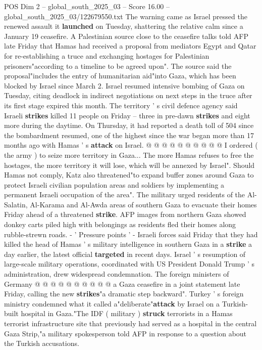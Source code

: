 \begin{textsample}{POS Dim 2 – global\_south\_2025\_03 – Score 16.00 – global\_south\_2025\_03/122679550.txt}  \label{ex:f2_pos_287}
The warning came as Israel pressed the renewed assault it \textbf{launched} on Tuesday, shattering the relative calm since a January 19 ceasefire.
A Palestinian source close to the ceasefire talks told AFP late Friday that Hamas had received a proposal from mediators Egypt and Qatar for re-establishing a truce and exchanging hostages for Palestinian prisoners"according to a timeline to be agreed upon".
The source said the proposal"includes the entry of humanitarian aid"into Gaza, which has been blocked by Israel since March 2.
Israel resumed intensive bombing of Gaza on Tuesday, citing deadlock in indirect negotiations on next steps in the truce after its first stage expired this month.
The territory ' s civil defence agency said Israeli \textbf{strikes} killed 11 people on Friday -- three in pre-dawn \textbf{strikes} and eight more during the daytime.
On Thursday, it had reported a death toll of 504 since the bombardment resumed, one of the highest since the war began more than 17 months ago with Hamas ' s \textbf{attack} on Israel. @ @ @ @ @ @ @ @ @ @ I ordered ( the army ) to seize more territory in Gaza...
The more Hamas refuses to free the hostages, the more territory it will lose, which will be annexed by Israel".
Should Hamas not comply, Katz also threatened"to expand buffer zones around Gaza to protect Israeli civilian population areas and soldiers by implementing a permanent Israeli occupation of the area".
The military urged residents of the Al-Salatin, Al-Karama and Al-Awda areas of southern Gaza to evacuate their homes Friday ahead of a threatened \textbf{strike}.
AFP images from northern Gaza showed donkey carts piled high with belongings as residents fled their homes along rubble-strewn roads. - ' Pressure points ' - Israeli forces said Friday that they had killed the head of Hamas ' s military intelligence in southern Gaza in a \textbf{strike} a day earlier, the latest official \textbf{targeted} in recent days.
Israel ' s resumption of large-scale military operations, coordinated with US President Donald Trump ' s administration, drew widespread condemnation.
The foreign ministers of Germany @ @ @ @ @ @ @ @ @ @ a Gaza ceasefire in a joint statement late Friday, calling the new \textbf{strikes}"a dramatic step backward".
Turkey ' s foreign ministry condemned what it called a"deliberate"\textbf{attack} by Israel on a Turkish-built hospital in Gaza."The IDF ( military ) \textbf{struck} terrorists in a Hamas terrorist infrastructure site that previously had served as a hospital in the central Gaza Strip,"a military spokesperson told AFP in response to a question about the Turkish accusations.

\end{textsample}

